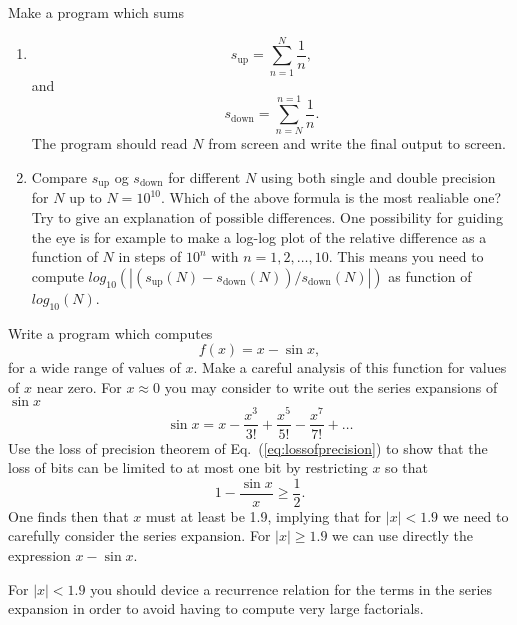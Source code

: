 \begin{prob}
Make a program which sums
\begin{enumerate}
\item
\[
   s_{\mathrm{up}}=\sum_{n=1}^{N}\frac{1}{n},
\]
and
\[
   s_{\mathrm{down}}=\sum_{n=N}^{n=1}\frac{1}{n}.
\]
The program should read $N$ from screen and write the final output to screen.
\item
Compare  $s_{\mathrm{up}}$ og $s_{\mathrm{down}}$ for different $N$ 
using both single and double precision for $N$ up to $N=10^{10}$.
Which of the above formula is the most realiable one? 
Try to give an explanation of possible differences. 
One possibility for guiding the eye is 
for example to make  
a log-log plot of the  relative difference as a function of  $N$ in steps of $10^n$
with $n=1,2,\dots,10$. This means you need to compute 
$log_{10}(|(s_{\mathrm{up}}(N)-s_{\mathrm{down}}(N))/s_{\mathrm{down}}(N)|)$
as function of  $log_{10}(N)$. 
\end{enumerate}
\end{prob}


\begin{prob}
Write a program which computes 
\[
   f(x) = x -\sin{x},
\]
for a wide range of values of $x$.  Make a careful analysis of this function for values
of $x$ near zero. For $x \approx 0$ you may consider to write out the series expansions of 
$\sin{x}$
\[
   \sin{x} = x -\frac{x^3}{3!}+\frac{x^5}{5!}-\frac{x^7}{7!}+\dots
\]
Use the loss of precision theorem of Eq.~(\ref{eq:lossofprecision})  to show that the loss of bits 
can be limited to at most one bit by restricting $x$ so that
\[
  1-\frac{\sin{x}}{x}  \ge \frac{1}{2}.
\]
One finds then that $x$ must at least be 1.9, implying that for $|x| < 1.9$ we need to carefully
consider the series expansion. For $|x|\ge 1.9$ we can use directly the expression
$x-\sin{x}$.  

For $|x| < 1.9$ you should device a recurrence relation for the terms in the series
expansion in order to avoid having to compute very large factorials.
\end{prob}


